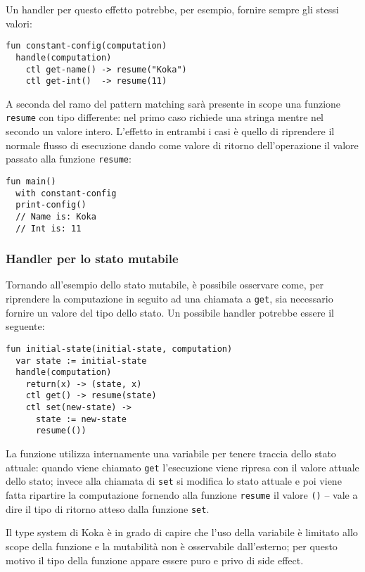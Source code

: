 Un handler per questo effetto potrebbe, per esempio, fornire sempre gli stessi valori:
\begin{lstlisting}[language=koka]
fun constant-config(computation)
  handle(computation)
    ctl get-name() -> resume("Koka")
    ctl get-int()  -> resume(11)
\end{lstlisting}
A seconda del ramo del pattern matching sarà presente in scope una funzione \lstinline{resume} con tipo differente: nel primo caso richiede una stringa mentre nel secondo un valore intero.
L'effetto in entrambi i casi è quello di riprendere il normale flusso di esecuzione dando come valore di ritorno dell'operazione il valore passato alla funzione \lstinline{resume}:
\begin{lstlisting}[language=koka]
fun main()
  with constant-config
  print-config()
  // Name is: Koka
  // Int is: 11
\end{lstlisting}

\subsubsection{Handler per lo stato mutabile}
Tornando all'esempio dello stato mutabile, è possibile osservare come, per riprendere la computazione in seguito ad una chiamata a \lstinline{get}, sia necessario fornire un valore del tipo dello stato.
Un possibile handler potrebbe essere il seguente:
\begin{lstlisting}[language=koka]
fun initial-state(initial-state, computation)
  var state := initial-state
  handle(computation) 
    return(x) -> (state, x)
    ctl get() -> resume(state)
    ctl set(new-state) ->
      state := new-state
      resume(())
\end{lstlisting}

La funzione utilizza internamente una variabile per tenere traccia dello stato attuale: quando viene chiamato \lstinline{get} l'esecuzione viene ripresa con il valore attuale dello stato; invece alla chiamata di \lstinline{set} si modifica lo stato attuale e poi viene fatta ripartire la computazione fornendo alla funzione \lstinline{resume} il valore \lstinline{()} -- vale a dire il tipo di ritorno atteso dalla funzione \lstinline{set}.

Il type system di Koka è in grado di capire che l'uso della variabile è limitato allo scope della funzione e la mutabilità non è osservabile dall'esterno; per questo motivo il tipo della funzione appare essere puro e privo di side effect.
